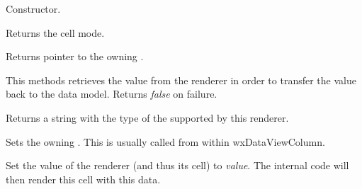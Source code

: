 


\label{wxdataviewrendererwxdataviewrenderer}


Constructor.

\label{wxdataviewrenderergetmode}


Returns the cell mode.

\label{wxdataviewrenderergetowner}


Returns pointer to the owning .

\label{wxdataviewrenderergetvalue}


This methods retrieves the value from the renderer in order to
transfer the value back to the data model. Returns {\it false}
on failure.

\label{wxdataviewrenderergetvarianttype}


Returns a string with the type of the 
supported by this renderer.

\label{wxdataviewrenderersetowner}


Sets the owning . This
is usually called from within wxDataViewColumn.

\label{wxdataviewrenderersetvalue}


Set the value of the renderer (and thus its cell) to {\it value}.
The internal code will then render this cell with this data.



